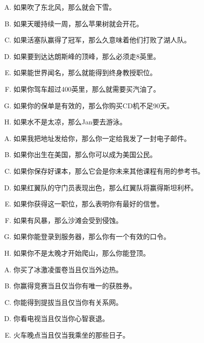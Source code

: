 {{        %
        \begin{practices}
            \begin{enumerate}[A.]
                \item 如果吹了东北风，那么就会下雪。
                \item 如果天暖持续一周，那么苹果树就会开花。
                \item 如果活塞队赢得了冠军，那么久意味着他们打败了湖人队。
                \item 如果要到达达朗斯峰的顶峰，那么必须走8英里。
                \item 如果能世界闻名，那么就能得到终身教授职位。
                \item 如果你驾车超过400英里，那么就需要买汽油了。
                \item 如果你的保单是有效的，那么你购买CD机不足90天。
                \item 如果水不是太凉，那么Jan要去游泳。
            \end{enumerate}
        \end{practices}

        \begin{practices}
            \begin{enumerate}[A.]
                \item 如果我把地址发给你，那么你一定给我发了一封电子邮件。
                \item 如果你出生在美国，那么你可以成为美国公民。
                \item 如果你保存好课本，那么它会是你未来其他课程有用的参考书。
                \item 如果红翼队的守门员表现出色，那么红翼队将赢得斯坦利杯。
                \item 如果你获得这一职位，那么表明你有最好的信誉。
                \item 如果有风暴，那么沙滩会受到侵蚀。
                \item 如果你能登录到服务器，那么你有一个有效的口令。
                \item 如果你不是太晚才开始爬山，那么你能登顶。
            \end{enumerate}
        \end{practices}

        \begin{practices}
            \begin{enumerate}[A.]
                \item 你买了冰激凌蛋卷当且仅当外边热。
                \item 你赢得竞赛当且仅当你有唯一的获胜券。
                \item 你能得到提拔当且仅当你有关系网。
                \item 你看电视当且仅当你心智衰退。
                \item 火车晚点当且仅当我乘坐的那些日子。
            \end{enumerate}
        \end{practices}

}}
